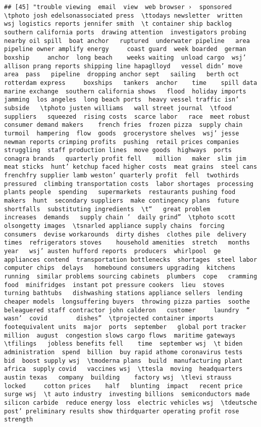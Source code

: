 \documentclass[
]{article}
\begin{document}
\begin{verbatim}
## [45] "trouble viewing  email  view  web browser ›  sponsored    \tphoto josh edelsonassociated press  \ttodays newsletter  written  wsj logistics reports jennifer smith  \t container ship backlog  southern california ports  drawing attention  investigators probing  nearby oil spill  boat anchor   ruptured  underwater pipeline   area pipeline owner amplify energy     coast guard  week boarded  german boxship     anchor  long beach    weeks waiting  unload cargo  wsj’ allison prang reports shipping line hapaglloyd   vessel didn’ move   area  pass   pipeline  dropping anchor sept   sailing   berth oct   rotterdam express     boxships   tankers  anchor    time    spill data   marine exchange  southern california shows   flood  holiday imports jamming  los angeles  long beach ports  heavy vessel traffic isn’   subside   \tphoto justen williams   wall street journal  \tfood suppliers   squeezed  rising costs  scarce labor   race  meet robust consumer demand makers    french fries  frozen pizza  supply chain turmoil  hampering  flow  goods  grocerystore shelves  wsj’ jesse newman reports crimping profits  pushing  retail prices companies  struggling  staff production lines  move goods  highways  ports conagra brands   quarterly profit fell    million   maker  slim jim meat sticks  hunt’ ketchup faced higher costs  meat grains  steel cans frenchfry supplier lamb weston’ quarterly profit  fell  twothirds pressured  climbing transportation costs  labor shortages  processing plants people  spending   supermarkets  restaurants pushing food makers  hunt  secondary suppliers  make contingency plans  future shortfalls  substituting ingredients  \t“   great problem     increases  demands   supply chain ’  daily grind”  \tphoto scott olsongetty images  \tsnarled appliance supply chains  forcing consumers  devise workarounds  dirty dishes  clothes pile  delivery times  refrigerators stoves    household amenities  stretch   months   year   wsj’ austen hufford reports  producers  whirlpool  ge appliances contend  transportation bottlenecks  shortages  steel labor  computer chips  delays   homebound consumers upgrading  kitchens  running  similar problems sourcing cabinets  plumbers  cope   cramming food  minifridges  instant pot pressure cookers  lieu  stoves   turning bathtubs   dishwashing stations appliance sellers  lending  cheaper models  longsuffering buyers  throwing pizza parties  soothe beleaguered staff contractor john calderon   customer     laundry  “  wasn’  covid        dishes”  \tprojected container imports  footequivalent units  major  ports  september   global port tracker    million  august  congestion slows cargo flows  maritime gateways  \tfilings   jobless benefits fell    time  september wsj  \t biden administration  spend  billion  buy rapid athome coronavirus tests   bid  boost supply wsj  \tmoderna plans  build  manufacturing plant  africa  supply covid   vaccines wsj  \ttesla  moving  headquarters  austin texas   company  building    factory wsj  \tlevi strauss   locked     cotton prices    half   blunting  impact   recent price surge wsj  \t auto industry  investing billions  semiconductors made  silicon carbide  reduce energy loss  electric vehicles wsj  \tdeutsche post’ preliminary results show thirdquarter operating profit rose   strength   
\end{verbatim}
\end{document}
